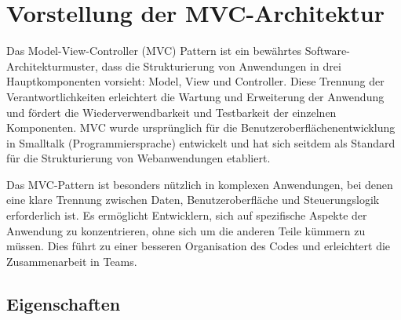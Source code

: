 
\chapter{Vorstellung der MVC-Architektur}
\label{chap:vorstellung}

Das Model-View-Controller (MVC) Pattern ist ein bewährtes Software-Architekturmuster, dass die Strukturierung von Anwendungen in drei Hauptkomponenten vorsieht: Model, View und Controller. Diese Trennung der Verantwortlichkeiten erleichtert die Wartung und Erweiterung der Anwendung und fördert die Wiederverwendbarkeit und Testbarkeit der einzelnen Komponenten. MVC wurde ursprünglich für die Benutzeroberflächenentwicklung in Smalltalk (Programmiersprache) entwickelt und hat sich seitdem als Standard für die Strukturierung von Webanwendungen etabliert.

Das MVC-Pattern ist besonders nützlich in komplexen Anwendungen, bei denen eine klare Trennung zwischen Daten, Benutzeroberfläche und Steuerungslogik erforderlich ist. Es ermöglicht Entwicklern, sich auf spezifische Aspekte der Anwendung zu konzentrieren, ohne sich um die anderen Teile kümmern zu müssen. Dies führt zu einer besseren Organisation des Codes und erleichtert die Zusammenarbeit in Teams.


\section{Eigenschaften}


